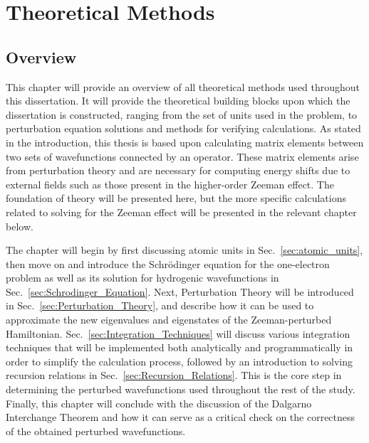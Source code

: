 \chapter{Theoretical Methods} \label{Theoretical_Methods}
    \section{Overview}
        This chapter will provide an overview of all theoretical methods used throughout this dissertation. It will provide the theoretical building blocks upon which the dissertation is constructed, ranging from the set of units used in the problem, to perturbation equation solutions and methods for verifying calculations. As stated in the introduction, this thesis is based upon calculating matrix elements between two sets of wavefunctions connected by an operator. These matrix elements arise from perturbation theory and are necessary for computing energy shifts due to external fields such as those present in the higher-order Zeeman effect. The foundation of theory will be presented here, but the more specific calculations related to solving for the Zeeman effect will be presented in the relevant chapter below.

        The chapter will begin by first discussing atomic units in Sec.~\ref{sec:atomic_units}, then move on and introduce the Schrödinger equation for the one-electron problem as well as its solution for hydrogenic wavefunctions in Sec.~\ref{sec:Schrodinger_Equation}. Next, Perturbation Theory will be introduced in Sec.~\ref{sec:Perturbation_Theory}, and describe how it can be used to approximate the new eigenvalues and eigenstates of the Zeeman-perturbed Hamiltonian. Sec.~\ref{sec:Integration_Techniques} will discuss various integration techniques that will be implemented both analytically and programmatically in order to simplify the calculation process, followed by an introduction to solving recursion relations in Sec.~\ref{sec:Recursion_Relations}. This is the core step in determining the perturbed wavefunctions used throughout the rest of the study. Finally, this chapter will conclude with the discussion of the Dalgarno Interchange Theorem and how it can serve as a critical check on the correctness of the obtained perturbed wavefunctions.
